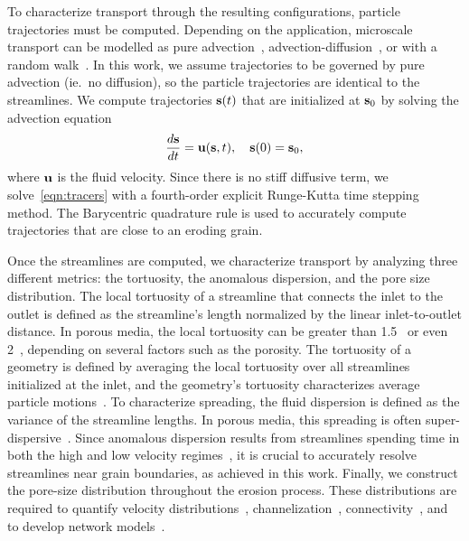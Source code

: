 \documentclass{jfm}
\begin{document}
To characterize transport through the resulting configurations, particle
trajectories must be computed. Depending on the application, microscale
transport can be modelled as pure advection~\citep{dea-qua-bir-jua2018,
cve-che-wen1996, puy-gou-den2019},
advection-diffusion~\citep{cus-hu-den1995, dag1987, den-ica-hid2018}, or
with a random walk~\citep{saf1959, bij-blu2006, ber-sch-sil2000}.  In
this work, we assume trajectories to be governed by pure advection
(ie.~no diffusion), so the particle trajectories are identical to the
streamlines. We compute trajectories $\ss(t)$ that are initialized at
$\ss_0$ by solving the advection equation
\begin{align}
  \frac{d\ss}{dt} = \uu(\ss,t), \quad \ss(0) = \ss_0,
  \label{eqn:tracers}
\end{align}
where $\uu$ is the fluid velocity.  Since there is no stiff diffusive
term, we solve~\eqref{eqn:tracers} with a fourth-order explicit
Runge-Kutta time stepping method. The Barycentric quadrature rule is
used to accurately compute trajectories that are close to an eroding
grain. 

Once the streamlines are computed, we characterize transport by
analyzing three different metrics: the tortuosity, the anomalous
dispersion, and the pore size distribution.  The local tortuosity of a
streamline that connects the inlet to the outlet is defined as the
streamline's length normalized by the linear inlet-to-outlet distance.
In porous media, the local tortuosity can be greater than
1.5~\citep{kop-kat-tim1996, mat-kha-koz2008} or even
2~\citep{dud-koz-mat2011}, depending on several factors such as the
porosity. The tortuosity of a geometry is defined by averaging the local
tortuosity over all streamlines initialized at the inlet, and the
geometry's tortuosity characterizes average particle
motions~\citep{hak-com-den2019}.  To characterize spreading, the fluid
dispersion is defined as the variance of the streamline lengths. In
porous media, this spreading is often
super-dispersive~\citep{kan-dea-nun-bij-blu-jua2014, cus-hu-den1995,
dea-leb-den-tar-bol-dav2013}. Since anomalous dispersion results from
streamlines spending time in both the high and low velocity
regimes~\citep{ber-sch2001}, it is crucial to accurately resolve
streamlines near grain boundaries, as achieved in this work.  Finally,
we construct the pore-size distribution throughout the erosion process.
These distributions are required to quantify velocity
distributions~\citep{ali-par-wei-bre2017, dea-qua-bir-jua2018},
channelization~\citep{sie-ili-pri-riv-gua2019},
connectivity~\citep{knu-car2005, wes-blo-gra2001}, and to develop
network models~\citep{bry-kin-mel1993, bry-mel-cad1993, bij-blu2006}. 
\end{document}
